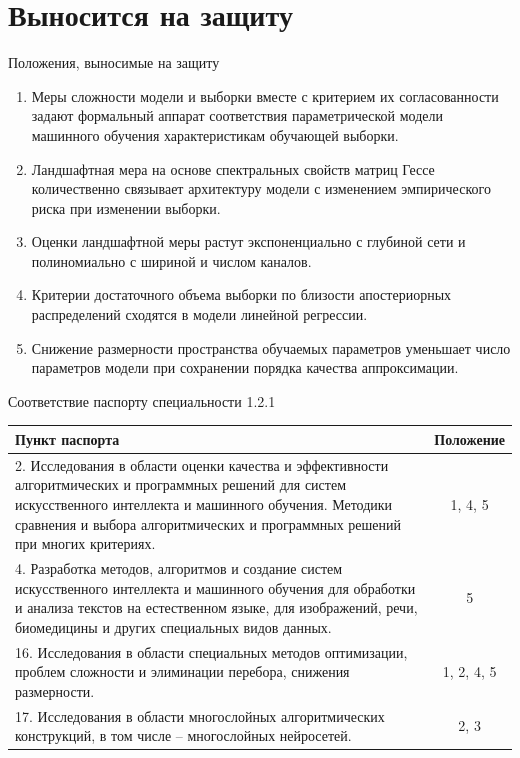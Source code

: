 \documentclass[10pt,pdf,hyperref={unicode}]{beamer}
\begin{document}
\section{Выносится на защиту}
\begin{frame}{Положения, выносимые на защиту}
\justifying
\footnotesize
\begin{enumerate}
    \justifying
    \setlength{\itemsep}{0pt}
    \item Меры сложности модели и выборки вместе с критерием их согласованности задают формальный аппарат соответствия параметрической модели машинного обучения характеристикам обучающей выборки.
    \item Ландшафтная мера на основе спектральных свойств матриц Гессе количественно связывает архитектуру модели с изменением эмпирического риска при изменении выборки.
    \item Оценки ландшафтной меры растут экспоненциально с глубиной сети и полиномиально с шириной и числом каналов.
    \item Критерии достаточного объема выборки по близости апостериорных распределений сходятся в модели линейной регрессии.
    \item Снижение размерности пространства обучаемых параметров уменьшает число параметров модели при сохранении порядка качества аппроксимации.
\end{enumerate}
\end{frame}
\begin{frame}{Соответствие паспорту специальности 1.2.1}
\justifying
\begin{center}
\begin{tabular}{|p{}|c|}
\hline
\textbf{Пункт паспорта} & \textbf{Положение} \\
\hline
2. Исследования в области оценки качества и эффективности алгоритмических и программных решений для систем искусственного интеллекта и машинного обучения. Методики сравнения и выбора алгоритмических и программных решений при многих критериях. & 1, 4, 5 \\
\hline
4. Разработка методов, алгоритмов и создание систем искусственного интеллекта и машинного обучения для обработки и анализа текстов на естественном языке, для изображений, речи, биомедицины и других специальных видов данных. & 5 \\
\hline
16. Исследования в области специальных методов оптимизации, проблем сложности и элиминации перебора, снижения размерности. & 1, 2, 4, 5 \\
\hline
17. Исследования в области многослойных алгоритмических конструкций, в том числе – многослойных нейросетей. & 2, 3 \\
\hline
\end{tabular}
\end{center}
\end{frame}
\end{document}
